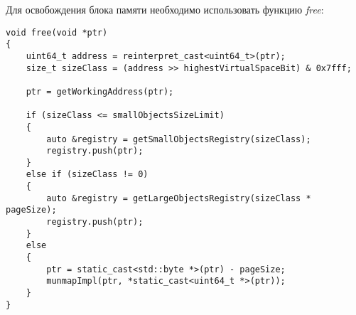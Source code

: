 Для освобождения блока памяти необходимо использовать функцию \textit{free}:
\begin{lstlisting}
void free(void *ptr)
{
	uint64_t address = reinterpret_cast<uint64_t>(ptr);
	size_t sizeClass = (address >> highestVirtualSpaceBit) & 0x7fff;
	
	ptr = getWorkingAddress(ptr);
	
	if (sizeClass <= smallObjectsSizeLimit)
	{
		auto &registry = getSmallObjectsRegistry(sizeClass);
		registry.push(ptr);
	}
	else if (sizeClass != 0)
	{
		auto &registry = getLargeObjectsRegistry(sizeClass * pageSize);
		registry.push(ptr);
	}
	else
	{
		ptr = static_cast<std::byte *>(ptr) - pageSize;
		munmapImpl(ptr, *static_cast<uint64_t *>(ptr));
	}
}
\end{lstlisting}
